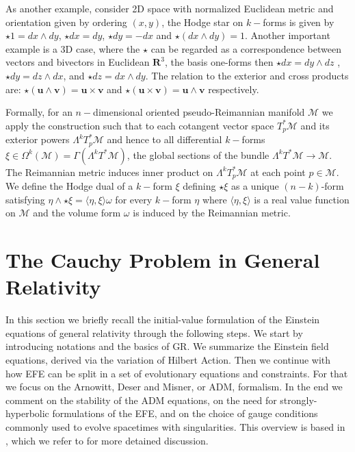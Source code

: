 \documentclass[11pt,a4paper,headinclude=true,DIV=14,BCOR=8mm,chapterprefix,listof=totoc,twoside,openright,abstracton]{scrbook}
\begin{document}
As another example, consider 2D space with normalized Euclidean metric and orientation given by ordering $(x,y)$, the Hodge star on $k-$forms is given by $\star 1 = dx \wedge dy$, $\star dx = dy$, $\star dy = -dx$ and $ \star(dx \wedge dy) = 1 $. 
Another important example is a 3D case, where the $\star$ can be regarded as a correspondence between vectors and bivectors in Euclidean $\boldsymbol{R}^3$, the basis one-forms then $ \star dx = dy\wedge dz$ , $\star dy = dz\wedge dx$, and $\star dz = dx \wedge dy$. The relation to the exterior and cross products are: $\star(\boldsymbol{u}\wedge\boldsymbol{v})=\boldsymbol{u}\times\boldsymbol{v}$ and $\star(\boldsymbol{u}\times\boldsymbol{v}) = \boldsymbol{u}\wedge\boldsymbol{v}$ respectively.

Formally, for an $n-$dimensional oriented pseudo-Reimannian manifold $\mathcal{M}$ we apply the construction such that to each cotangent vector space $T^* _p \mathcal{M}$ and its exterior powers $\Lambda^k T_p ^* \mathcal{M}$ and hence to all differential $k-$forms $\xi\in\Omega^k(\mathcal{M})=\Gamma(\Lambda^k T^* \mathcal{M})$, the global sections of the bundle $\Lambda^k T^*\mathcal{M}\rightarrow \mathcal{M}$. The Reimannian metric induces inner product on $\Lambda^k T_p ^* \mathcal{M}$ at each point $p\in\mathcal{M}$. We define the Hodge dual of a $k-$form $\xi$ defining $\star\xi$ as a unique $(n-k)$-form satisfying $\eta\wedge\star\xi = \langle\eta,\xi\rangle\omega$ for every $k-$form $\eta$ where $\langle\eta,\xi\rangle$ is a real value function on $\mathcal{M}$ and the volume form $\omega$ is induced by the Reimannian metric.


\section{The Cauchy Problem in General Relativity}

In this section we briefly recall the initial-value formulation of the Einstein equations of general relativity through the following steps. We start by introducing notations and the basics of GR. We summarize the Einstein field equations, derived via the variation of Hilbert Action. Then we continue with how EFE can be split in a set of evolutionary equations and constraints. For that we focus on the Arnowitt, Deser and Misner, or ADM, formalism. In the end we comment on the stability of the ADM equations, on the need for strongly-hyperbolic formulations of the EFE, and on the choice of gauge conditions commonly used to evolve spacetimes with singularities. This overview is based in \cite{Arnowitt:1962hi,Landau:1982dva,Wald:1984,Misner:1973,Baumgarte:2002jm}, which we refer to for more detained discussion.
\end{document}
